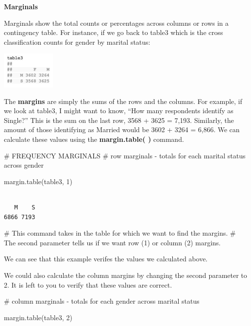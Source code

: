 \documentclass[
  letterpaper,
  DIV=11,
  numbers=noendperiod]{scrreprt}
\newenvironment{Shaded}{\begin{snugshade}}{\end{snugshade}}
\newcommand{\CommentTok}[1]{\textcolor[rgb]{0.37,0.37,0.37}{#1}}
\newcommand{\DecValTok}[1]{\textcolor[rgb]{0.68,0.00,0.00}{#1}}
\newcommand{\FunctionTok}[1]{\textcolor[rgb]{0.28,0.35,0.67}{#1}}
\newcommand{\NormalTok}[1]{\textcolor[rgb]{0.00,0.23,0.31}{#1}}
\begin{document}
\textbf{Marginals}

Marginals show the total counts or percentages across columns or rows in
a contingency table. For instance, if we go back to table3 which is the
cross classification counts for gender by marital status:

\includegraphics[width=0.2\textwidth,height=\textheight]{./images/Daily-6-Pic-2.jpg}

The \textbf{margins} are simply the sums of the rows and the columns.
For example, if we look at table3, I might want to know, ``How many
respondents identify as Single?'' This is the sum on the last row, 3568
+ 3625 = 7,193. Similarly, the amount of those identifying as Married
would be 3602 + 3264 = 6,866. We can calculate these values using the
\textbf{margin.table( )} command.

\begin{Shaded}
\begin{Highlighting}[]
\CommentTok{\# FREQUENCY MARGINALS}
\CommentTok{\# row marginals {-} totals for each marital status across gender}

\FunctionTok{margin.table}\NormalTok{(table3, }\DecValTok{1}\NormalTok{)}
\end{Highlighting}
\end{Shaded}

\begin{verbatim}

   M    S 
6866 7193 
\end{verbatim}

\begin{Shaded}
\begin{Highlighting}[]
\CommentTok{\# This command takes in the table for which we want to find the margins.}
\CommentTok{\# The second parameter tells us if we want row (1) or column (2) margins.}
\end{Highlighting}
\end{Shaded}

We can see that this example verifes the values we calculated above.

We could also calculate the column margins by changing the second
parameter to 2. It is left to you to verify that these values are
correct.

\begin{Shaded}
\begin{Highlighting}[]
\CommentTok{\# column marginals {-} totals for each gender across marital status}

\FunctionTok{margin.table}\NormalTok{(table3, }\DecValTok{2}\NormalTok{)}
\end{Highlighting}
\end{Shaded}
\end{document}
